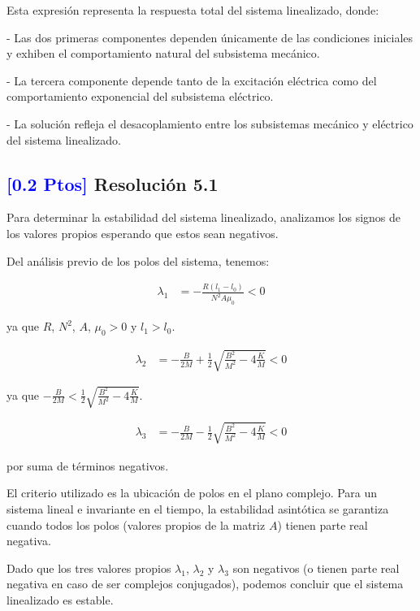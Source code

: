 \documentclass[
  11pt,
  letterpaper,
   addpoints,
   answers
  ]{exam}
\begin{document}
\begin{solution}
Esta expresión representa la respuesta total del sistema linealizado, donde:

- Las dos primeras componentes dependen únicamente de las condiciones iniciales y exhiben el comportamiento natural del subsistema mecánico.

- La tercera componente depende tanto de la excitación eléctrica como del comportamiento exponencial del subsistema eléctrico.

- La solución refleja el desacoplamiento entre los subsistemas mecánico y eléctrico del sistema linealizado.

\subsection*{\textcolor{blue}{[0.2 Ptos]} Resolución 5.1}

Para determinar la estabilidad del sistema linealizado, analizamos los signos de los valores propios esperando que estos sean negativos.

Del análisis previo de los polos del sistema, tenemos:

\begin{align}
\lambda_1 &= -\frac{R(l_1-l_0)}{N^2A\mu_0} < 0
\end{align}

ya que $R$, $N^2$, $A$, $\mu_0 > 0$ y $l_1 > l_0$.

\begin{align}
\lambda_2 &= -\frac{B}{2M} + \frac{1}{2}\sqrt{\frac{B^2}{M^2} - 4\frac{K}{M}} < 0
\end{align}

ya que $-\frac{B}{2M} < \frac{1}{2}\sqrt{\frac{B^2}{M^2} - 4\frac{K}{M}}$.

\begin{align}
\lambda_3 &= -\frac{B}{2M} - \frac{1}{2}\sqrt{\frac{B^2}{M^2} - 4\frac{K}{M}} < 0
\end{align}

por suma de términos negativos.

El criterio utilizado es la ubicación de polos en el plano complejo. Para un sistema lineal e invariante en el tiempo, la estabilidad asintótica se garantiza cuando todos los polos (valores propios de la matriz $A$) tienen parte real negativa.

Dado que los tres valores propios $\lambda_1$, $\lambda_2$ y $\lambda_3$ son negativos (o tienen parte real negativa en caso de ser complejos conjugados), podemos concluir que el sistema linealizado es estable.


\end{solution}
\end{document}
